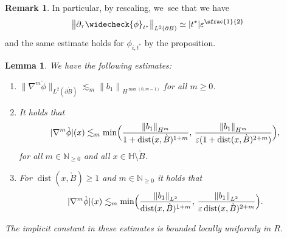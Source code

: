 \documentclass[10pt]{amsart}
\let\epsilon\varepsilon
\let\backslash\setminus
\newtheorem{lemma}[theorem]{Lemma}
\theoremstyle{definition}
\newtheorem{remark}[theorem]{Remark}
\DeclareMathOperator{\dist}{dist}
\newcommand\N{\mathbb{N}}
\newcommand\norm[1]{\left\lVert #1\right\rVert}
\newcommand\bnorm[1]{\bigl\lVert #1\bigr\rVert}
\let\chek\widecheck
\let\de\partial
\let\eps\epsilon
\begin{document}
\begin{remark}
In particular, by rescaling, we~see that we have
\begin{align*}
\bnorm{\de_\tau\chek{\phi}_{t^*}}_{L^2(\de B)}\simeq |t^*|\eps^{\sfrac{1}{2}}
\end{align*}
and the same estimate holds for $\phi_{i,t^*}$ by the proposition.
\end{remark}

\begin{lemma}\label{Lem:Decay1}
We have the following estimates:
\begin{enumerate}
\item\label{Lem:Decay1a}
$\bnorm{\nabla^m\grave{\phi}}_{L^2(\de\grave{B})}\lesssim_m \norm{b_1}_{H^{\max(0,m-1)}}$ for all $m\geq 0$.
\item\label{Lem:Decay1b}
It holds that
\begin{align*}
|\nabla^m\grave{\phi}|(x)\lesssim_m \min\Bigl(\frac{\norm{b_1}_{H^{m}}}{1+\dist(x,\grave{B})^{1+m}},\,\frac{\norm{b_1}_{H^{m}}}{\eps(1+\dist(x,\grave{B})^{2+m})}\Bigr),%
\end{align*}
for all $m\in \N_{\geq 0}$ and all $x\in \mathbb{H}\backslash \grave{B}$.
\item\label{Lem:Decay1c}
For $\dist(x,\grave{B})\geq 1$ and $m\in\N_{\geq 0}$ it holds that
\begin{align*}
|\nabla^m\grave{\phi}|(x)\lesssim_m \min\Bigl(\frac{\norm{b_1}_{L^2}}{\dist(x,\grave{B})^{1+m}},\,\frac{\norm{b_1}_{L^2}}{\eps\dist(x,\grave{B})^{2+m}}\Bigr).
\end{align*}
\end{enumerate}
The implicit constant in these estimates is bounded locally uniformly in $R$.
\end{lemma}
\end{document}
